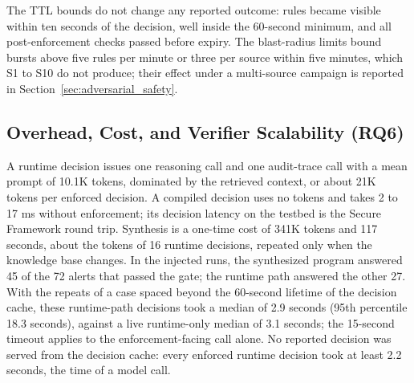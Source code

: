 \documentclass[final,5p]{elsarticle}
\begin{document}
The TTL bounds do not change any reported outcome: rules became visible within ten seconds of the decision, well inside the 60-second minimum, and all post-enforcement checks passed before expiry. The blast-radius limits bound bursts above five rules per minute or three per source within five minutes, which S1 to S10 do not produce; their effect under a multi-source campaign is reported in Section~\ref{sec:adversarial_safety}.

\subsection{Overhead, Cost, and Verifier Scalability (RQ6)}
\label{sec:overhead}

A runtime decision issues one reasoning call and one audit-trace call with a mean prompt of 10.1K tokens, dominated by the retrieved context, or about 21K tokens per enforced decision. A compiled decision uses no tokens and takes 2 to 17 ms without enforcement; its decision latency on the testbed is the Secure Framework round trip. Synthesis is a one-time cost of 341K tokens and 117 seconds, about the tokens of 16 runtime decisions, repeated only when the knowledge base changes. In the injected runs, the synthesized program answered 45 of the 72 alerts that passed the gate; the runtime path answered the other 27. With the repeats of a case spaced beyond the 60-second lifetime of the decision cache, these runtime-path decisions took a median of 2.9 seconds (95th percentile 18.3 seconds), against a live runtime-only median of 3.1 seconds; the 15-second timeout applies to the enforcement-facing call alone. No reported decision was served from the decision cache: every enforced runtime decision took at least 2.2 seconds, the time of a model call.
\end{document}
